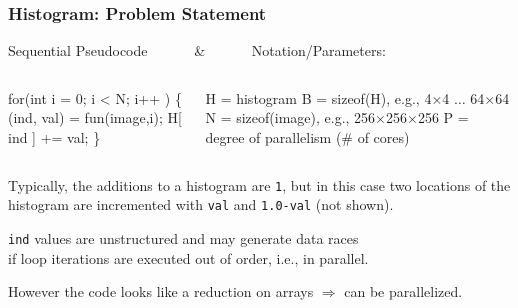 \documentclass{beamer}
\renewcommand{\emph}[1]{\textcolor{structure}{#1}}
\newcommand{\mymath}[1]{$ #1 $}
\begin{document}
\begin{frame}[fragile,t]
  \frametitle{Histogram: Problem Statement}
  
\begin{block}{Sequential Pseudocode \mbox{~~~~~~}\&\mbox{~~~~~~} Notation/Parameters:}
\begin{columns}
\begin{colorcode}[fontsize=\scriptsize]
for(int i = 0; i < N; i++ ) \{
    (ind, val) = fun(image,i);
    H[ ind ] += val;
\}
\end{colorcode}
\begin{colorcode}[fontsize=\scriptsize]
H = histogram
B = sizeof(H), e.g., 4\mymath{\times}4 \mymath{\dots} 64\mymath{\times}64 
N = sizeof(image), e.g., 256\mymath{\times}256\mymath{\times}256 
P = degree of parallelism (\# of cores)
\end{colorcode}
\end{columns}
\end{block} 

\bigskip
Typically, the additions to a histogram are {\tt 1},
but in this case two locations of the histogram are
incremented with {\tt val} and {\tt 1.0-val} (not shown).\bigskip  

{\tt ind} values are unstructured and may generate data races\\
if loop iterations are executed out of order, i.e., in parallel.

\bigskip
However the code looks like a reduction on arrays $\Rightarrow$ can be \emph{parallelized}.

\end{frame}
\end{document}

